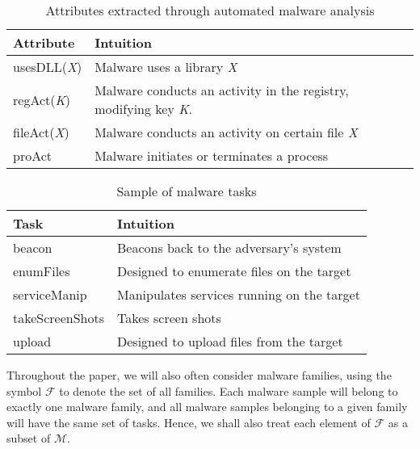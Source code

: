 \documentclass[conference]{IEEEtran}
\def\M{\mathcal{M}}
\def\F{\mathcal{F}}
\begin{document}
\vspace{-1em}
\begin{table}[h!]
	\caption{\textmd{Attributes extracted through automated malware analysis}}
	\label{exAt}
	\centering
	\renewcommand{\arraystretch}{1.5}
	
	\begin{tabular}{|p{2.3cm}|p{5cm}|} 
		\hline
		{\bf Attribute} &  {\bf Intuition} \\ \hline 
	
		\textsf{usesDLL(}\textit{X}\textsf{)} & Malware uses a library \textit{X}\\ \hline
		\textsf{regAct(}\textit{K}\textsf{)} & Malware conducts an activity in the registry, modifying key \textit{K}.\\ \hline
		\textsf{fileAct(}\textit{X}\textsf{)} & Malware conducts an activity on certain file \textit{X}\\ \hline
		\textsf{proAct} & Malware initiates or terminates a process\\ 
		\hline
	\end{tabular}
	\vspace{-1em}
	
\end{table}

\vspace{-1em}
\begin{table}[h!]
	\caption{\textmd{Sample of malware tasks}}
	\label{exTask}
	\centering
	\renewcommand{\arraystretch}{1.5}
	
	
	\begin{tabular}{|p{2.2cm}|p{5cm}|} 
		\hline
		{\bf Task} &  {\bf Intuition} \\ \hline 
		\textsf{beacon} & Beacons back to the adversary's system\\  \hline
		\textsf{enumFiles} & Designed to enumerate files on the target\\ \hline
		\textsf{serviceManip} & Manipulates services running on the target\\ \hline
		\textsf{takeScreenShots} & Takes screen shots\\ \hline
		\textsf{upload} & Designed to upload files from the target\\ 
		\hline
	\end{tabular}
	\vspace{-1em}
	
\end{table}

Throughout the paper, we will also often consider malware families, using the symbol $\F$ to denote the set of all families.  Each malware sample will belong to exactly one malware family, and all malware samples belonging to a given family will have the same set of tasks. Hence, we shall also treat each element of $\F$ as a subset of $\M$.
\end{document}
